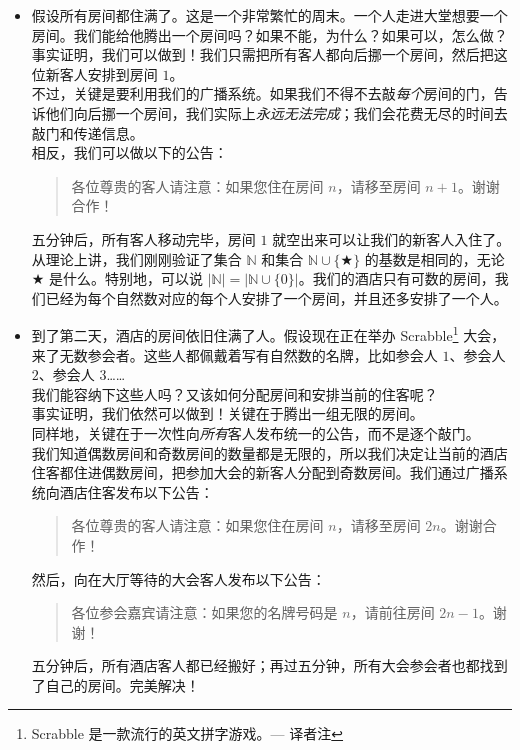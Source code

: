 \begin{itemize}
    \item 假设所有房间都住满了。这是一个非常繁忙的周末。一个人走进大堂想要一个房间。我们能给他腾出一个房间吗？如果不能，为什么？如果可以，怎么做？\\

          事实证明，我们可以做到！我们只需把所有客人都向后挪一个房间，然后把这位新客人安排到房间 $1$。\\

          不过，关键是要利用我们的广播系统。如果我们不得不去敲\emph{每个}房间的门，告诉他们向后挪一个房间，我们实际上\emph{永远无法完成}；我们会花费无尽的时间去敲门和传递信息。\\

          相反，我们可以做以下的公告：
          \begin{quotation}
              各位尊贵的客人请注意：如果您住在房间 $n$，请移至房间 $n+1$。谢谢合作！
          \end{quotation}
          五分钟后，所有客人移动完毕，房间 $1$ 就空出来可以让我们的新客人入住了。\\

          从理论上讲，我们刚刚验证了集合 $\mathbb{N}$ 和集合 $\mathbb{N} \cup \{ \bigstar \}$ 的基数是相同的，无论 $\bigstar$ 是什么。特别地，可以说 $|\mathbb{N}| = |\mathbb{N} \cup \{0\}|$。我们的酒店只有可数的房间，我们已经为每个自然数对应的每个人安排了一个房间，并且还多安排了一个人。\\
    \item 到了第二天，酒店的房间依旧住满了人。假设现在正在举办 Scrabble\footnote{Scrabble 是一款流行的英文拼字游戏。--- 译者注} 大会，来了无数参会者。这些人都佩戴着写有自然数的名牌，比如参会人 $1$、参会人 $2$、参会人 $3$……\\

          我们能容纳下这些人吗？又该如何分配房间和安排当前的住客呢？\\

          事实证明，我们依然可以做到！关键在于腾出一组无限的房间。\\

          同样地，关键在于一次性向\emph{所有}客人发布统一的公告，而不是逐个敲门。\\

          我们知道偶数房间和奇数房间的数量都是无限的，所以我们决定让当前的酒店住客都住进偶数房间，把参加大会的新客人分配到奇数房间。我们通过广播系统向酒店住客发布以下公告：
          \begin{quotation}
              各位尊贵的客人请注意：如果您住在房间 $n$，请移至房间 $2n$。谢谢合作！
          \end{quotation}
          然后，向在大厅等待的大会客人发布以下公告：
          \begin{quotation}
              各位参会嘉宾请注意：如果您的名牌号码是 $n$，请前往房间 $2n - 1$。谢谢！
          \end{quotation}
          五分钟后，所有酒店客人都已经搬好；再过五分钟，所有大会参会者也都找到了自己的房间。完美解决！\\


\end{itemize}
